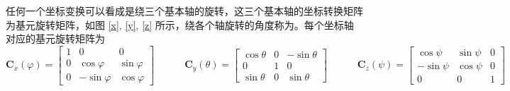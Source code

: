 {
	\quad 任何一个坐标变换可以看成是绕三个基本轴的旋转，这三个基本轴的坐标转换矩阵为基元旋转矩阵，如图 \ref{x}, \ref{y}, \ref{z} 所示，绕各个轴旋转的角度称为。每个坐标轴对应的基元旋转矩阵为
	\begin{equation}
		\bm{C}_x (\varphi) =
		\begin{bmatrix}
			1 & 0 & 0 \\
			0 & \cos \varphi & \sin \varphi \\
			0 & - \sin \varphi & \cos \varphi 
		\end{bmatrix}
		\qquad \quad
		\bm{C}_y (\theta) = 
		\begin{bmatrix}
			\cos \theta & 0 & - \sin \theta \\
			0 & 1 & 0 \\
			\sin \theta & 0 & \sin \theta 
		\end{bmatrix}
		\qquad \quad
		\bm{C}_z (\psi) = 
		\begin{bmatrix}
			\cos \psi & \sin \psi & 0 \\
			- \sin \psi &\cos \psi & 0 \\
			0 & 0 & 1
		\end{bmatrix}
	\end{equation}
}
